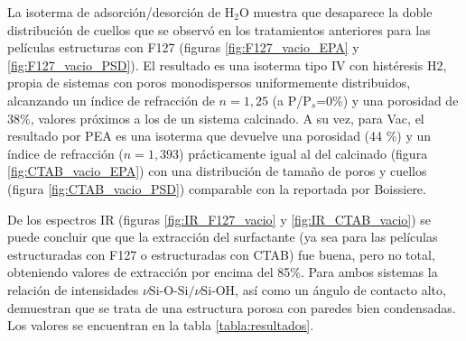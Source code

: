 		 La isoterma de adsorción/desorción de H$_2$O muestra que desaparece la doble distribución de cuellos que se observó en los tratamientos anteriores para las películas estructuras con F127 (figuras \ref{fig:F127_vacio_EPA} y \ref{fig:F127_vacio_PSD}). El resultado es una isoterma tipo IV con histéresis H2, propia de sistemas con poros monodispersos uniformemente distribuidos, alcanzando un índice de refracción de $n=1,25$ (a P/P$_s$=0\%) y una porosidad de $38\%$, valores próximos a los de un sistema calcinado. A su vez, para Vac\pdmC, el resultado por PEA es una isoterma que devuelve una porosidad (44 \%) y un índice de refracción ($n=1,393$) prácticamente igual al del calcinado (figura \ref{fig:CTAB_vacio_EPA}) con una distribución de tamaño de poros y cuellos (figura \ref{fig:CTAB_vacio_PSD}) comparable con la reportada por Boissiere\cite{Boissiere2005}.

		 De los espectros IR  (figuras \ref{fig:IR_F127_vacio} y \ref{fig:IR_CTAB_vacio}) se puede concluir que que la extracción del surfactante (ya sea para las películas estructuradas con F127 o estructuradas con CTAB) fue buena, pero no total, obteniendo valores de extracción por encima del 85\%. Para ambos sistemas la relación de intensidades $\nu{\text{Si-O-Si/}}\nu{\text{Si-OH}}$, así como un ángulo de contacto alto, demuestran que se trata de una estructura porosa con paredes bien condensadas. Los valores se encuentran en la tabla \ref{tabla:resultados}.


